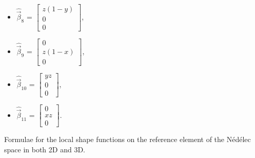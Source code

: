 \begin{table}[!ht]
\begin{multicols}{3}
\begin{itemize}
        \item[] $\hat{\vec{\beta}}_8$ = $\begin{bmatrix}z(1-y) \\ 0 \\ 0\end{bmatrix}$, \\
        \item[] $\hat{\vec{\beta}}_9$ = $\begin{bmatrix}0 \\ z(1-x) \\ 0\end{bmatrix}$, \\
        \item[] $\hat{\vec{\beta}}_{10}$ = $\begin{bmatrix}yz \\ 0 \\ 0\end{bmatrix}$, \\
        \item[] $\hat{\vec{\beta}}_{11}$ = $\begin{bmatrix}0 \\ xz \\ 0\end{bmatrix}$. \\
    \end{itemize}
    \end{multicols}
    \renewcommand{\tablename}{Collection}
    \caption{Formulae for the local shape functions on the reference element of the Nédélec space in both 2D and 3D.}
    \renewcommand{\tablename}{Table}
    \label{tab:shape_funcs}
\end{table}


